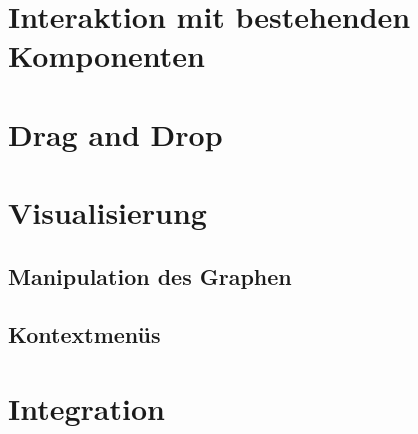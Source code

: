 \cite{webpack}

\section[Interkation]{Interaktion mit bestehenden Komponenten}

\section{Drag and Drop}

\section{Visualisierung}

\subsection{Manipulation des Graphen}

\subsection{Kontextmenüs}

\section{Integration}

